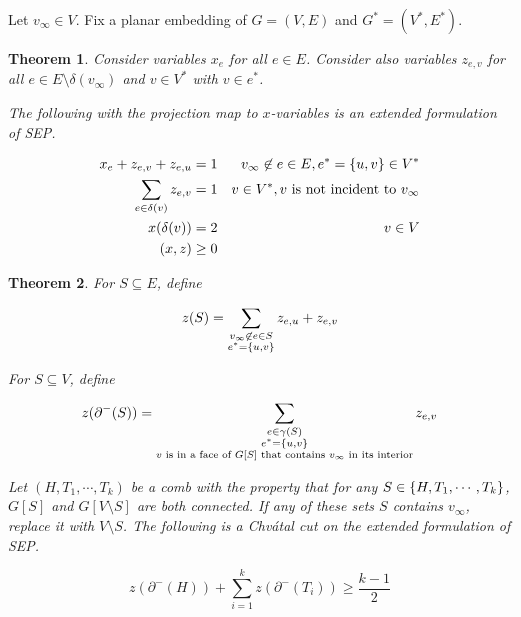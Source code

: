 \documentclass{memoir}
\theoremstyle{plain}
\newtheorem{theorem}{Theorem}
\theoremstyle{definition}
\begin{document}
Let $v_\infty \in V$.
Fix a planar embedding of $G=(V,E)$ and $G^* = (V^*, E^*)$.

\begin{theorem}
Consider variables $x_e$ for all $e\in E$. 
Consider also variables $z_{e,v}$ for all $e\in E\setminus\delta(v_\infty)$
and $v\in V^*$ with $v\in e^*$.

The following with the projection map to $x$-variables is an extended formulation of SEP.

\begin{align}
x_e + z_{e,v}+z_{e,u} &= 1 & v_\infty \not\in e \in E, e^* = \cbr{u,v} \in V^* \label{oneuse} \\
\sum_{e\in\delta(v)} z_{e,v} &= 1 & v\in V^*, \text{$v$ is not incident to $v_\infty$} \label{facedegree} \\
x(\delta(v)) &= 2 & v\in V \label{vertexdegree} \\
(x,z) &\geq 0
\end{align}
\end{theorem}


\begin{theorem}
For $S\subseteq E$, define

$$z(S) = \sum_{\substack{v_\infty\not\in e\in S \\ e^* = \cbr{u,v}}} z_{e,u} + z_{e,v}$$

For $S\subseteq V$, define 

$$z(\partial^-(S)) = \sum_{\substack{e \in \gamma(S) \\ e^* = \cbr{u,v} \\ \text{$v$ is in a face of $G[S]$ that contains $v_\infty$ in its interior}}} z_{e,v}$$


Let $(H, T_1, \cdots, T_k)$ be a comb with the property that for any $S\in\cbr{H, T_1,\cdots, T_k}$, $G[S]$ and $G[V\setminus S]$ are both connected. If any of these sets $S$ contains $v_\infty$,
replace it with $V\setminus S$.
The following is a Chv\'{a}tal cut on the extended formulation of SEP.

$$z(\partial^-(H)) +  \sum_{i=1}^k z(\partial^-(T_i)) \geq \frac{k-1}{2}$$



\end{theorem}
\end{document}

